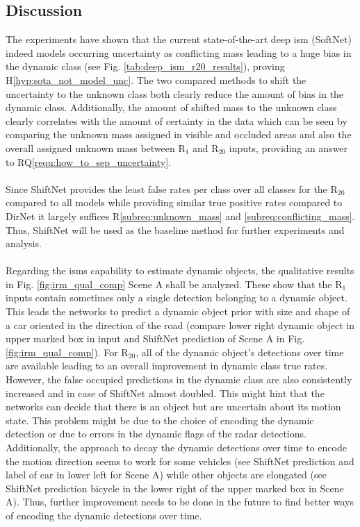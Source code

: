 \subsection{Discussion}
\label{subsec:discussion_aleat_uncert}
The experiments have shown that the current state-of-the-art deep \gls{ism} (SoftNet) indeed models occurring uncertainty as conflicting mass leading to a huge bias in the dynamic class (see Fig. \ref{tab:deep_ism_r20_results}), proving H\ref{hyp:sota_not_model_unc}. The two compared methods to shift the uncertainty to the unknown class both clearly reduce the amount of bias in the dynamic class. Additionally, the amount of shifted mass to the unknown class clearly correlates with the amount of certainty in the data which can be seen by comparing the unknown mass assigned in visible and occluded areas and also the overall assigned unknown mass between R$_1$ and R$_{20}$ inputs, providing an answer to RQ\ref{requ:how_to_sep_uncertainty}. 
\\\\
Since ShiftNet provides the least false rates per class over all classes for the R$_{20}$ compared to all models while providing similar true positive rates compared to DirNet it largely suffices R\ref{subreq:unknown_mass} and \ref{subreq:conflicting_mass}. Thus, ShiftNet will be used as the baseline method for further experiments and analysis.
\\\\
Regarding the \gls{ism}s capability to estimate dynamic objects, the qualitative results in Fig. \ref{fig:irm_qual_comp} Scene A shall be analyzed. These show that the R$_1$ inputs contain sometimes only a single detection belonging to a dynamic object. This leads the networks to predict a dynamic object prior with size and shape of a car oriented in the direction of the road (compare lower right dynamic object in upper marked box in input and ShiftNet prediction of Scene A in Fig. \ref{fig:irm_qual_comp}). For R$_{20}$, all of the dynamic object's detections over time are available leading to an overall improvement in dynamic class true rates. However, the false occupied predictions in the dynamic class are also consistently increased and in case of ShiftNet almost doubled. This might hint that the networks can decide that there is an object but are uncertain about its motion state. This problem might be due to the choice of encoding the dynamic detection or due to errors in the dynamic flags of the radar detections. Additionally, the approach to decay the dynamic detections over time to encode the motion direction seems to work for some vehicles (see ShiftNet prediction and label of car in lower left for Scene A) while other objects are elongated (see ShiftNet prediction bicycle in the lower right of the upper marked box in Scene A). Thus, further improvement needs to be done in the future to find better ways of encoding the dynamic detections over time.
